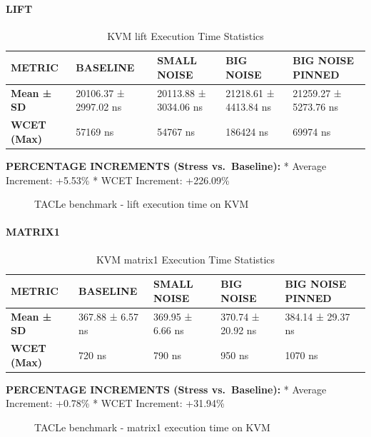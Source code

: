 \paragraph{LIFT}\label{lift}

\begin{table}
\centering
\caption{KVM lift Execution Time Statistics}
\label{tab:kvm:lift}
\begin{tabularx}{\linewidth}{@{}YYYYY@{}}
\toprule
METRIC & BASELINE & SMALL NOISE & BIG NOISE & BIG NOISE PINNED\tabularnewline
\midrule
\textbf{Mean ± SD} & 20106.37 ± 2997.02 ns & 20113.88 ± 3034.06 ns & 21218.61 ± 4413.84 ns & 21259.27 ± 5273.76 ns\tabularnewline
\textbf{WCET (Max)} & 57169 ns & 54767 ns & 186424 ns & 69974 ns\tabularnewline
\bottomrule
\end{tabularx}
\end{table}

\textbf{PERCENTAGE INCREMENTS (Stress vs.~Baseline):} * Average
Increment: +5.53\% * WCET Increment: +226.09\%

\begin{figure}
\centering

\caption{TACLe benchmark - lift execution time on KVM}
\end{figure}

\paragraph{MATRIX1}\label{matrix1}

\begin{table}
\centering
\caption{KVM matrix1 Execution Time Statistics}
\label{tab:kvm:matrix1}
\begin{tabularx}{\linewidth}{@{}YYYYY@{}}
\toprule
METRIC & BASELINE & SMALL NOISE & BIG NOISE & BIG NOISE PINNED\tabularnewline
\midrule
\textbf{Mean ± SD} & 367.88 ± 6.57 ns & 369.95 ± 6.66 ns & 370.74 ± 20.92 ns & 384.14 ± 29.37 ns\tabularnewline
\textbf{WCET (Max)} & 720 ns & 790 ns & 950 ns & 1070 ns\tabularnewline
\bottomrule
\end{tabularx}
\end{table}

\textbf{PERCENTAGE INCREMENTS (Stress vs.~Baseline):} * Average
Increment: +0.78\% * WCET Increment: +31.94\%

\begin{figure}
\centering

\caption{TACLe benchmark - matrix1 execution time on KVM}
\end{figure}

